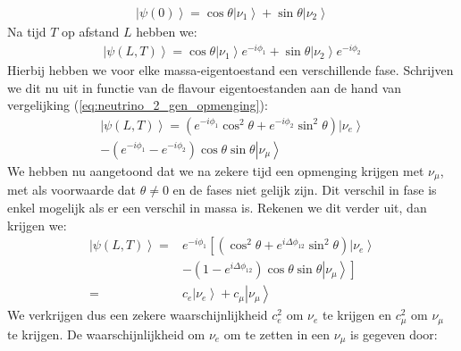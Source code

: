 \documentclass[../main.tex]{subfiles}
\begin{document}
\begin{equation}
    \begin{aligned}
        \label{eq:neutrino_2_oscilaties_1}
        \left|\psi(0)\right>=\cos \theta\left| \nu_{1}\right>+\sin \theta \left| \nu_{2}\right>
    \end{aligned}
\end{equation}
Na tijd $T$ op afstand $L$ hebben we:
\begin{equation}
    \begin{aligned}
        \label{eq:neutrino_2_oscilaties_2}
        \left|\psi(L, T)\right>=\cos \theta\left| \nu_{1}\right>e^{-i \phi_{1}}+\sin \theta \left| \nu_{2}\right>e^{-i \phi_{2}}
    \end{aligned}
\end{equation}
Hierbij hebben we voor elke massa-eigentoestand een verschillende fase. Schrijven we dit nu uit in functie van de flavour eigentoestanden aan de hand van vergelijking (\ref{eq:neutrino_2_gen_opmenging}):
\begin{equation}
    \begin{aligned}
        \label{eq:neutrino_2_oscilaties_3}
        \left|\psi(L, T)\right>=\left(e^{-i \phi_{1}} \cos ^{2} \theta+e^{-i \phi_{2}} \sin ^{2} \theta\right)\left| \nu_{e}\right>\\
        -\left(e^{-i \phi_{1}}-e^{-i \phi_{2}}\right) \cos \theta \sin \theta \left| \nu_{\mu}\right>
    \end{aligned}
\end{equation}
We hebben nu aangetoond dat we na zekere tijd een opmenging krijgen met $\nu_\mu$, met als voorwaarde dat $\theta\neq 0$ en de fases niet gelijk zijn. Dit verschil in fase is enkel mogelijk als er een verschil in massa is. Rekenen we dit verder uit, dan krijgen we:
\begin{equation}
    \begin{aligned}
        \label{eq:neutrino_2_oscilaties_4}
        \left|\psi(L, T)\right>=& e^{-i \phi_{1}}\left[\left(\cos ^{2} \theta+e^{i \Delta \phi_{12}} \sin ^{2} \theta\right)\left|\nu_{e}\right>\right.\\
                                &\left.-\left(1-e^{i \Delta \phi_{12}}\right) \cos \theta \sin \theta\left|\nu_{\mu}\right>\right] \\
        =& c_{e}\left|\nu_{e}\right>+c_{\mu}\left| \nu_{\mu}\right>
    \end{aligned}
\end{equation}
We verkrijgen dus een zekere waarschijnlijkheid $c_e^2$ om $\nu_e$ te krijgen en $c_\mu^2$ om $\nu_\mu$ te krijgen. De waarschijnlijkheid om $\nu_e$ om te zetten in een $\nu_\mu$ is gegeven door:
\end{document}
